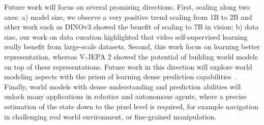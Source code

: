 \documentclass[]{fairmeta}
\newcommand{\TODO}[1]{\textcolor{red}{TODO: #1}}
\begin{document}
Future work will focus on several promising directions. First, scaling along two axes: a) model size, we observe a very positive trend scaling from 1B to 2B and other work such as DINOv3 showed the benefit of scaling to 7B in vision; b) data size, our work on data curation highlighted that video self-supervised learning really benefit from large-scale datasets. Second, this work focus on learning better representation, whereas V-JEPA 2 showed the potential of building world models on top of these representations. Future work in this direction will explore world modeling aspects with the prism of learning dense prediction capabilities~\citep{karypidis2025dinof, baldassarre2025dinow}. Finally, world models with dense understanding and prediction abilities will unlock many applications in robotics and autonomous agents, where a precise estimation of the state down to the pixel level is required, for example navigation in challenging real world environment, or fine-grained manipulation.






\end{document}
